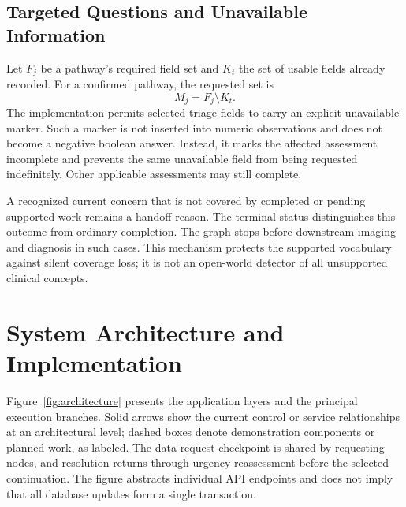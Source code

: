 \documentclass[conference]{IEEEtran}
\newcommand{\code}[1]{\texttt{\detokenize{#1}}}
\begin{document}
\subsection{Targeted Questions and Unavailable Information}
Let $F_j$ be a pathway's required field set and $K_t$ the set of usable fields already recorded. For a confirmed pathway, the requested set is
\begin{equation}
M_j=F_j\setminus K_t.
\end{equation}
The implementation permits selected triage fields to carry an explicit unavailable marker. Such a marker is not inserted into numeric observations and does not become a negative boolean answer. Instead, it marks the affected assessment incomplete and prevents the same unavailable field from being requested indefinitely. Other applicable assessments may still complete.

A recognized current concern that is not covered by completed or pending supported work remains a handoff reason. The terminal status \code{REQUIRES_CLINICIAN_ASSESSMENT} distinguishes this outcome from ordinary completion. The graph stops before downstream imaging and diagnosis in such cases. This mechanism protects the supported vocabulary against silent coverage loss; it is not an open-world detector of all unsupported clinical concepts.

\section{System Architecture and Implementation}
Figure~\ref{fig:architecture} presents the application layers and the principal execution branches. Solid arrows show the current control or service relationships at an architectural level; dashed boxes denote demonstration components or planned work, as labeled. The data-request checkpoint is shared by requesting nodes, and resolution returns through urgency reassessment before the selected continuation. The figure abstracts individual API endpoints and does not imply that all database updates form a single transaction.
\end{document}
